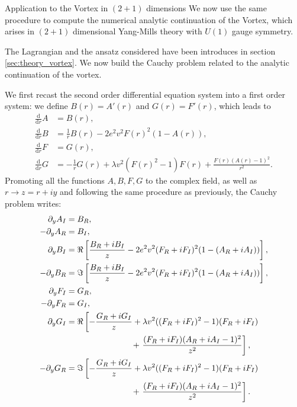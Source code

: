 \begin{section}{Application to the Vortex in $(2+1)$ dimensions}
  We now use the same procedure to compute the numerical analytic
  continuation of the Vortex, which arises in $(2+1)$ dimensional
  Yang-Mills theory with $U(1)$ gauge symmetry.
  
  The Lagrangian and the ansatz considered have been introduces in
  section \ref{sec:theory_vortex}. We now build the Cauchy problem related to the
  analytic continuation of the vortex.

  We first recast the second order differential equation system into a
  first order system: we define $B(r)=A'(r)$ and $G(r) = F'(r)$, which leads to
  \begin{align}
    \frac{\mathrm{d}}{\mathrm{d}r}A &= B(r),\\
    \frac{\mathrm{d}}{\mathrm{d}r}B &= \frac{1}{r}B(r)-2e^2 v^2F(r)^2(1-A(r)),\\
    \frac{\mathrm{d}}{\mathrm{d}r}F &= G(r),\\
    \frac{\mathrm{d}}{\mathrm{d}r}G &= -\frac{1}{r}G(r)+\lambda v^2(F(r)^2-1)F(r) +\frac{F(r)(A(r)-1)^2}{r^2}.
  \end{align}
  Promoting all the functions $A,B,F,G$ to the complex field, as well
  as $r\to z=r+iy$ and following the same procedure as previously, the
  Cauchy problem writes:
  \begin{align}
    \partial_y A_I &= B_R,\\
    -\partial_y A_R &= B_I,\\
    \partial_y B_I &= \Re\left[\frac{B_R+iB_I}{z}-2e^2v^2(F_R+iF_I)^2(1-(A_R+iA_I))\right],\\
    -\partial_y B_R &= \Im\left[\frac{B_R+iB_I}{z}-2e^2v^2(F_R+iF_I)^2(1-(A_R+iA_I))\right],\\
    \partial_y F_I &= G_R,\\
    -\partial_y F_R &= G_I,\\
    \partial_y G_I &= \Re\left[-\frac{G_R+iG_I}{z}+\lambda v^2((F_R+iF_I)^2-1)(F_R+iF_I)\right.\\
      &\hphantom{= \Re\left[-\frac{G_R+iG_I}{z}\right.}+\left.\frac{(F_R+iF_I)(A_R+iA_I-1)^2}{z^2}\right],\\
    -\partial_y G_R &= \Im\left[-\frac{G_R+iG_I}{z}+\lambda v^2((F_R+iF_I)^2-1)(F_R+iF_I)\right.\\
      &\hphantom{= \Re\left[-\frac{G_R+iG_I}{z}\right.}+\left.\frac{(F_R+iF_I)(A_R+iA_I-1)^2}{z^2}\right].\\
  \end{align}
  

\end{section}
